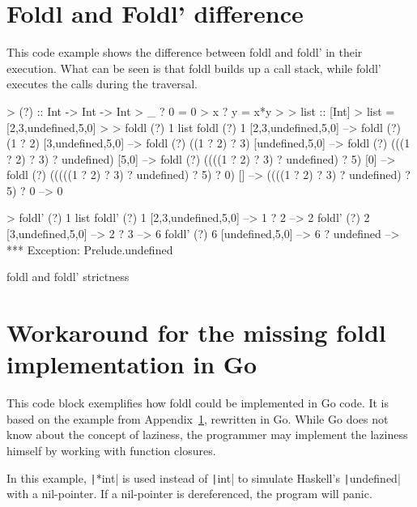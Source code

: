 \section{Foldl and Foldl' difference}\label{appendix:foldl-strictness}

This code example shows the difference between foldl and foldl' in their
execution. What can be seen is that foldl builds up a call stack, while
foldl' executes the calls during the traversal.

\begin{code}
    \begin{haskellcode}
> (?) :: Int -> Int -> Int
> _ ? 0 = 0
> x ? y = x*y
>
> list :: [Int]
> list = [2,3,undefined,5,0]
>
> foldl (?) 1 list
foldl (?) 1 [2,3,undefined,5,0] -->
foldl (?) (1 ? 2) [3,undefined,5,0] -->
foldl (?) ((1 ? 2) ? 3) [undefined,5,0] -->
foldl (?) (((1 ? 2) ? 3) ? undefined) [5,0] -->
foldl (?) ((((1 ? 2) ? 3) ? undefined) ? 5) [0] -->
foldl (?) (((((1 ? 2) ? 3) ? undefined) ? 5) ? 0) [] -->
((((1 ? 2) ? 3) ? undefined) ? 5) ? 0 -->
0

> foldl' (?) 1 list
foldl' (?) 1 [2,3,undefined,5,0] -->
    1 ? 2 --> 2
foldl' (?) 2 [3,undefined,5,0] -->
    2 ? 3 --> 6
foldl' (?) 6 [undefined,5,0] -->
    6 ? undefined -->
*** Exception: Prelude.undefined
    \end{haskellcode}
    \caption{foldl and foldl' strictness\autocite{fold-types}}
\end{code}

\section{Workaround for the missing foldl implementation in Go}\label{appendix:foldl-go}


This code block exemplifies how foldl could be implemented in Go code. It is based on the example
from Appendix~\ref{appendix:foldl-strictness}, rewritten in Go. While Go does not know about
the concept of laziness, the programmer may implement the laziness himself by working with function
closures.

In this example, \texttt|*int| is used instead of \texttt|int| to simulate Haskell's
\texttt|undefined| with a nil-pointer.
If a nil-pointer is dereferenced, the program will panic.

